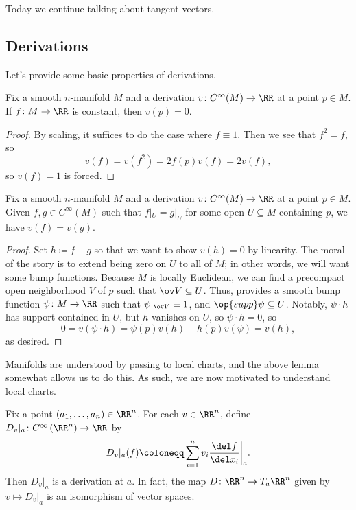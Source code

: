 \documentclass[../notes.tex]{subfiles}
\begin{document}
Today we continue talking about tangent vectors.

\subsection{Derivations}
Let's provide some basic properties of derivations.
\begin{lemma} \label{lem:deriv-const}
	Fix a smooth $n$-manifold $M$ and a derivation $v\colon C^\infty(M)\to\RR$ at a point $p\in M$. If $f\colon M\to\RR$ is constant, then $v(p)=0$.
\end{lemma}
\begin{proof}
	By scaling, it suffices to do the case where $f\equiv1$. Then we see that $f^2=f$, so
	\[v(f)=v\left(f^2\right)=2f(p)v(f)=2v(f),\]
	so $v(f)=1$ is forced.
\end{proof}
\begin{lemma} \label{lem:deriv-given-locally}
	Fix a smooth $n$-manifold $M$ and a derivation $v\colon C^\infty(M)\to\RR$ at a point $p\in M$. Given $f,g\in C^\infty(M)$ such that $f|_U=g|_U$ for some open $U\subseteq M$ containing $p$, we have $v(f)=v(g)$.
\end{lemma}
\begin{proof}
	Set $h\coloneqq f-g$ so that we want to show $v(h)=0$ by linearity. The moral of the story is to extend being zero on $U$ to all of $M$; in other words, we will want some bump functions. Because $M$ is locally Euclidean, we can find a precompact open neighborhood $V$ of $p$ such that $\ov V\subseteq U$. Thus,  provides a smooth bump function $\psi\colon M\to\RR$ such that $\psi|_{\ov V}\equiv1$, and $\op{supp}\psi\subseteq U$. Notably, $\psi\cdot h$ has support contained in $U$, but $h$ vanishes on $U$, so $\psi\cdot h=0$, so
	\[0=v(\psi\cdot h)=\psi(p)v(h)+h(p)v(\psi)=v(h),\]
	as desired.
\end{proof}
Manifolds are understood by passing to local charts, and the above lemma somewhat allows us to do this. As such, we are now motivated to understand local charts.
\begin{lemma} \label{lem:tangent-euclid}
	Fix a point $(a_1,\ldots,a_n)\in\RR^n$. For each $v\in\RR^n$, define $D_v|_a\colon C^\infty\left(\RR^n\right)\to\RR$ by
	\[D_v|_a(f)\coloneqq\sum_{i=1}^nv_i\frac{\del f}{\del x_i}\bigg|_a.\]
	Then $D_v|_a$ is a derivation at $a$. In fact, the map $D\colon\RR^n\to T_a\RR^n$ given by $v\mapsto D_v|_a$ is an isomorphism of vector spaces.
\end{lemma}
\end{document}
